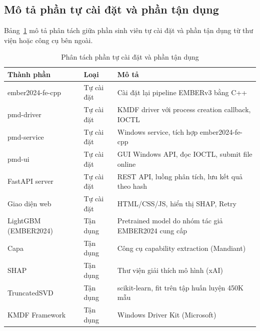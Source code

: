 \subsection{Mô tả phần tự cài đặt và phần tận dụng}

Bảng~\ref{tab:impl} mô tả phân tách giữa phần sinh viên tự cài đặt
và phần tận dụng từ thư viện hoặc công cụ bên ngoài.

\begin{table}[h]
\centering
\caption{Phân tách phần tự cài đặt và phần tận dụng}
\label{tab:impl}

\begin{tabularx}{\textwidth}{|p{3cm}|p{2.5cm}|X|}
\hline

\textbf{Thành phần} &
\textbf{Loại} &
\textbf{Mô tả} \\
\hline

ember2024-fe-cpp &
Tự cài đặt &
Cài đặt lại pipeline EMBERv3 bằng C++ \\
\hline

pmd-driver &
Tự cài đặt &
KMDF driver với process creation callback, IOCTL \\
\hline

pmd-service &
Tự cài đặt &
Windows service, tích hợp ember2024-fe-cpp \\
\hline

pmd-ui &
Tự cài đặt &
GUI Windows API, đọc IOCTL, submit file online \\
\hline

FastAPI server &
Tự cài đặt &
REST API, luồng phân tích, lưu kết quả theo hash \\
\hline

Giao diện web &
Tự cài đặt &
HTML/CSS/JS, hiển thị SHAP, Retry \\
\hline

LightGBM (EMBER2024) &
Tận dụng &
Pretrained model do nhóm tác giả EMBER2024 cung cấp \\
\hline

Capa &
Tận dụng &
Công cụ capability extraction (Mandiant) \\
\hline

SHAP &
Tận dụng &
Thư viện giải thích mô hình (xAI) \\
\hline

TruncatedSVD &
Tận dụng &
scikit-learn, fit trên tập huấn luyện 450K mẫu \\
\hline

KMDF Framework &
Tận dụng &
Windows Driver Kit (Microsoft) \\
\hline

\end{tabularx}

\end{table}

